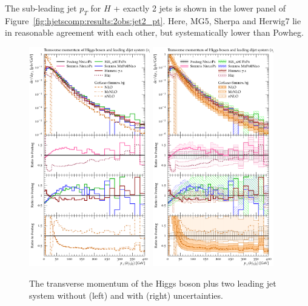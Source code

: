 The sub-leading jet $p_T$ for $H$ + exactly 2 jets is shown in the
lower panel of Figure~\ref{fig:hjetscomp:results:2obs:jet2_pt}.
Here, MG5, Sherpa and Herwig7 lie in reasonable agreement with each
other, but systematically lower than Powheg.


\begin{figure}[t!]
  \centering
  \includegraphics[width=0.47\textwidth]{figures/hjetscomp_u_Hjj_pT_incl.pdf}
  \hfill
  \includegraphics[width=0.47\textwidth]{figures/hjetscomp_Hjj_pT_incl.pdf}
  \caption{
    The transverse momentum of the Higgs boson plus two leading jet
    system without (left) and with (right) uncertainties.
    \label{fig:hjetscomp:results:2obs:hjj_pt}
  }
\end{figure}

